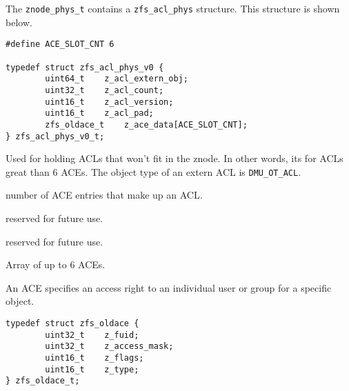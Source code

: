 The \lstinline{znode_phys_t} contains a \lstinline{zfs_acl_phys} structure.
This structure is shown below.

\begin{lstlisting}[style=c]
#define ACE_SLOT_CNT 6

typedef struct zfs_acl_phys_v0 {
        uint64_t	z_acl_extern_obj;
        uint32_t	z_acl_count;
        uint16_t	z_acl_version;
        uint16_t	z_acl_pad;
        zfs_oldace_t	z_ace_data[ACE_SLOT_CNT];
} zfs_acl_phys_v0_t;
\end{lstlisting}

\begin{description}[style=standard]
\item[z\_acl\_extern\_obj:]
  Used for holding ACLs that won't fit in the znode.
  In other words, its for ACLs great than 6 ACEs.
  The object type of an extern ACL is \lstinline{DMU_OT_ACL}.
\item[z\_acl\_count:]
  number of ACE entries that make up an ACL.
\item[z\_acl\_version:]
  reserved for future use.
\item[z\_acl\_pad:] reserved for future use.
\item[z\_ace\_data:] Array of up to 6 ACEs.
\end{description}

An ACE specifies an access right to an individual user or group for a specific object.

\begin{lstlisting}[style=c]
typedef struct zfs_oldace {
        uint32_t	z_fuid;
        uint32_t	z_access_mask;
        uint16_t	z_flags;
        uint16_t	z_type;
} zfs_oldace_t;
\end{lstlisting}


